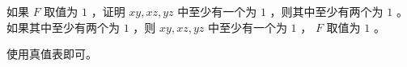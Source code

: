 {{        %
        \begin{practices}
            如果 $F$ 取值为 $1$ ，证明 $xy, xz, yz$ 中至少有一个为 $1$ ，则其中至少有两个为 $1$ 。
            如果其中至少有两个为 $1$ ，则 $xy, xz, yz$ 中至少有一个为 $1$ ， $F$ 取值为 $1$ 。
        \end{practices}

        \begin{practices}
            使用真值表即可。
        \end{practices}

        \begin{practices}

        \end{practices}

        \begin{practices}

        \end{practices}

        \begin{practices}

        \end{practices}

        \begin{practices}

        \end{practices}

        \begin{practices}

        \end{practices}

        \begin{practices}

        \end{practices}

        \begin{practices}

        \end{practices}

        \begin{practices}

        \end{practices}

        \begin{practices}

        \end{practices}

}}
